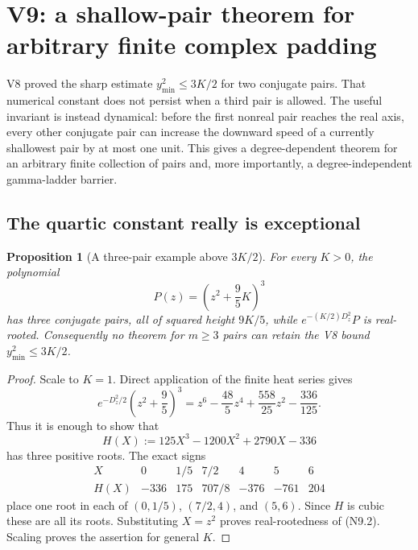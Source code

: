 \documentclass[11pt]{article}
\newtheorem{proposition}[theorem]{Proposition}
\theoremstyle{definition}
\theoremstyle{remark}
\begin{document}



\section{V9: a shallow-pair theorem for arbitrary finite complex padding}
\label{sec:grh-v9}

V8 proved the sharp estimate \(y_{\min}^2\le 3K/2\) for two conjugate
pairs.  That numerical constant does not persist when a third pair is
allowed.  The useful invariant is instead dynamical: before the first
nonreal pair reaches the real axis, every other conjugate pair can increase
the downward speed of a currently shallowest pair by at most one unit.
This gives a degree-dependent theorem for an arbitrary finite collection of
pairs and, more importantly, a degree-independent gamma-ladder barrier.

\subsection{The quartic constant really is exceptional}

\begin{proposition}[A three-pair example above \(3K/2\)]
\label{prop:f2v9-sextic}
For every \(K>0\), the polynomial
\[
 P(z)=\left(z^2+\frac95K\right)^3
 \tag{N9.1}
\]
has three conjugate pairs, all of squared height \(9K/5\), while
\(e^{-(K/2)D_z^2}P\) is real-rooted.  Consequently no theorem for
\(m\ge3\) pairs can retain the V8 bound \(y_{\min}^2\le3K/2\).
\end{proposition}

\begin{proof}
Scale to \(K=1\).  Direct application of the finite heat series gives
\[
 e^{-D_z^2/2}\left(z^2+\frac95\right)^3
 =z^6-\frac{48}{5}z^4+\frac{558}{25}z^2-\frac{336}{125}.
 \tag{N9.2}
\]
Thus it is enough to show that
\[
 H(X):=125X^3-1200X^2+2790X-336
 \tag{N9.3}
\]
has three positive roots.  The exact signs
\[
\begin{array}{c|rrrrrr}
X&0&1/5&7/2&4&5&6\\ \hline
H(X)&-336&175&707/8&-376&-761&204
\end{array}
\tag{N9.4}
\]
place one root in each of
\((0,1/5)\), \((7/2,4)\), and \((5,6)\).  Since \(H\) is cubic these are all
its roots.  Substituting \(X=z^2\) proves real-rootedness of
\textup{(N9.2)}.  Scaling proves the assertion for general \(K\).
\end{proof}
\end{document}
